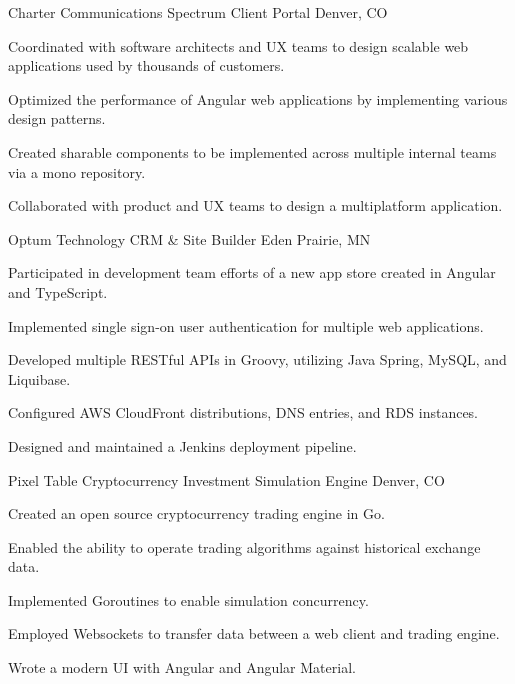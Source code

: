 \begin{cventries}
    \cventry
    {Charter Communications} %
    {Spectrum Client Portal} %
    {Denver, CO} %
    {} %
    {
    \begin{cvitems} %
        \item {Coordinated with software architects and UX teams to design scalable web applications used by thousands of customers.}
        \item {Optimized the performance of Angular web applications by implementing various design patterns.}
        \item {Created sharable components to be implemented across multiple internal teams via a mono repository.}
        \item {Collaborated with product and UX teams to design a multiplatform application.}
    \end{cvitems}
    }

    \cventry
    {Optum Technology} %
    {CRM \& Site Builder} %
    {Eden Prairie, MN} %
    {} %
    {
    \begin{cvitems} %
        \item {Participated in development team efforts of a new app store created in Angular and TypeScript.}
        \item {Implemented single sign-on user authentication for multiple web applications.}
        \item {Developed multiple RESTful APIs in Groovy, utilizing Java Spring, MySQL, and Liquibase.}
        \item {Configured AWS CloudFront distributions, DNS entries, and RDS instances.}
        \item {Designed and maintained a Jenkins deployment pipeline.}
    \end{cvitems}
    }

    \cventry
    {Pixel Table} %
    {Cryptocurrency Investment Simulation Engine} %
    {Denver, CO} %
    {} %
    {
    \begin{cvitems} %
        \item {Created an open source cryptocurrency trading engine in Go.}
        \item {Enabled the ability to operate trading algorithms against historical exchange data.}
        \item {Implemented Goroutines to enable simulation concurrency.}
        \item {Employed Websockets to transfer data between a web client and trading engine.}
        \item {Wrote a modern UI with Angular and Angular Material.}
    \end{cvitems}
    }


\end{cventries}

